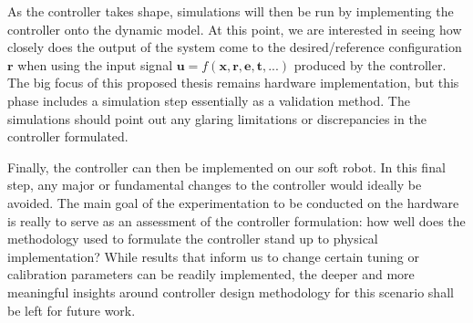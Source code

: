 As the controller takes shape, simulations will then be run by implementing the controller onto the dynamic model. At this point, we are interested in seeing how closely does the output of the system come to the desired/reference configuration $\mathbf{r}$ when using the input signal $\mathbf{u}=f(\mathbf{x,r,e,t,...})$ produced by the controller. The big focus of this proposed thesis remains hardware implementation, but this phase includes a simulation step essentially as a validation method. The simulations should point out any glaring limitations or discrepancies in the controller formulated. 

Finally, the controller can then be implemented on our soft robot. In this final step, any major or fundamental changes to the controller would ideally be avoided. The main goal of the experimentation to be conducted on the hardware is really to serve as an assessment of the controller formulation: how well does the methodology used to formulate the controller stand up to physical implementation? While results that inform us to change certain tuning or calibration parameters can be readily implemented, the deeper and more meaningful insights around controller design methodology for this scenario shall be left for future work.